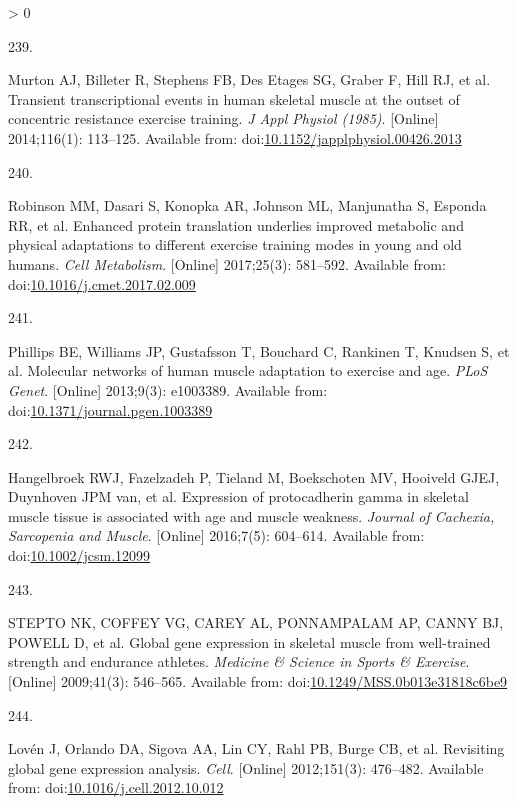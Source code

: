\documentclass[twoside,10pt]{gihclass} %
\newlength{\cslhangindent}
\newlength{\csllabelwidth}
\newenvironment{CSLReferences}[3] %
 {%
  \setlength{\parindent}{0pt}
  \ifodd #1 \everypar{\setlength{\hangindent}{\cslhangindent}}\ignorespaces\fi
  \ifnum #2 > 0
  \setlength{\parskip}{#2\baselineskip}
  \fi
 }%
 {}
\newcommand{\CSLLeftMargin}[1]{\parbox[t]{\maxof{\widthof{#1}}{\csllabelwidth}}{#1}}
\newcommand{\CSLRightInline}[1]{\parbox[t]{\linewidth}{#1}}
\begin{document}
\begin{CSLReferences}{0}{0}
\leavevmode\hypertarget{ref-RN2299}{}%
\CSLLeftMargin{239. }
\CSLRightInline{Murton AJ, Billeter R, Stephens FB, Des Etages SG, Graber F, Hill RJ, et al. Transient transcriptional events in human skeletal muscle at the outset of concentric resistance exercise training. \emph{J Appl Physiol (1985)}. {[}Online{]} 2014;116(1): 113--125. Available from: doi:\href{https://doi.org/10.1152/japplphysiol.00426.2013}{10.1152/japplphysiol.00426.2013}}

\leavevmode\hypertarget{ref-RN2400}{}%
\CSLLeftMargin{240. }
\CSLRightInline{Robinson MM, Dasari S, Konopka AR, Johnson ML, Manjunatha S, Esponda RR, et al. Enhanced protein translation underlies improved metabolic and physical adaptations to different exercise training modes in young and old humans. \emph{Cell Metabolism}. {[}Online{]} 2017;25(3): 581--592. Available from: doi:\href{https://doi.org/10.1016/j.cmet.2017.02.009}{10.1016/j.cmet.2017.02.009}}

\leavevmode\hypertarget{ref-RN753}{}%
\CSLLeftMargin{241. }
\CSLRightInline{Phillips BE, Williams JP, Gustafsson T, Bouchard C, Rankinen T, Knudsen S, et al. Molecular networks of human muscle adaptation to exercise and age. \emph{PLoS Genet}. {[}Online{]} 2013;9(3): e1003389. Available from: doi:\href{https://doi.org/10.1371/journal.pgen.1003389}{10.1371/journal.pgen.1003389}}

\leavevmode\hypertarget{ref-RN2402}{}%
\CSLLeftMargin{242. }
\CSLRightInline{Hangelbroek RWJ, Fazelzadeh P, Tieland M, Boekschoten MV, Hooiveld GJEJ, Duynhoven JPM van, et al. Expression of protocadherin gamma in skeletal muscle tissue is associated with age and muscle weakness. \emph{Journal of Cachexia, Sarcopenia and Muscle}. {[}Online{]} 2016;7(5): 604--614. Available from: doi:\href{https://doi.org/10.1002/jcsm.12099}{10.1002/jcsm.12099}}

\leavevmode\hypertarget{ref-RN2398}{}%
\CSLLeftMargin{243. }
\CSLRightInline{STEPTO NK, COFFEY VG, CAREY AL, PONNAMPALAM AP, CANNY BJ, POWELL D, et al. Global gene expression in skeletal muscle from well-trained strength and endurance athletes. \emph{Medicine \& Science in Sports \& Exercise}. {[}Online{]} 2009;41(3): 546--565. Available from: doi:\href{https://doi.org/10.1249/MSS.0b013e31818c6be9}{10.1249/MSS.0b013e31818c6be9}}

\leavevmode\hypertarget{ref-RN2359}{}%
\CSLLeftMargin{244. }
\CSLRightInline{Lovén J, Orlando DA, Sigova AA, Lin CY, Rahl PB, Burge CB, et al. Revisiting global gene expression analysis. \emph{Cell}. {[}Online{]} 2012;151(3): 476--482. Available from: doi:\href{https://doi.org/10.1016/j.cell.2012.10.012}{10.1016/j.cell.2012.10.012}}


\end{CSLReferences}
\end{document}
